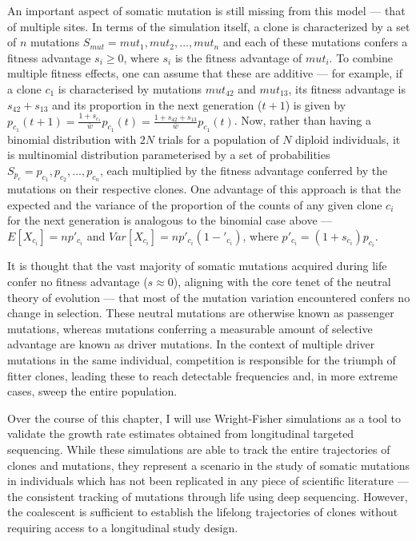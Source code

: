An important aspect of somatic mutation is still missing from this model --- that of multiple sites. In terms of the simulation itself, a clone is characterized by a set of $n$ mutations $S_{mut} = {mut_1,mut_2,...,mut_n}$ and each of these mutations confers a fitness advantage $s_i \geq 0$, where $s_i$ is the fitness advantage of $mut_i$. To combine multiple fitness effects, one can assume that these are additive --- for example, if a clone $c_1$ is characterised by mutations $mut_42$ and $mut_13$, its fitness advantage is $s_42 + s_13$ and its proportion in the next generation ($t+1$) is given by $p_{c_1}(t+1) = \frac{1+s_{c_1}}{\bar{w}}p_{c_1}(t) = \frac{1+s_{42}+s_{13}}{\bar{w}}p_{c_1}(t)$. Now, rather than having a binomial distribution with $2N$ trials for a population of $N$ diploid individuals, it is multinomial distribution parameterised by a set of probabilities $S_{p_c} = {p_{c_1},p_{c_2},...,p_{c_n}}$, each multiplied by the fitness advantage conferred by the mutations on their respective clones. One advantage of this approach is that the expected and the variance of the proportion of the counts of any given clone $c_i$ for the next generation is analogous to the binomial case above --- $E[X_{c_i}] = np'_{c_i}$ and $Var[X_{c_i}] = np'_{c_i}(1-'_{c_i})$, where $p'_{c_i} = (1+s_{c_i})p_{c_i}$. 

It is thought that the vast majority of somatic mutations acquired during life confer no fitness advantage ($s \approx 0$), aligning with the core tenet of the neutral theory of evolution --- that most of the mutation variation encountered confers no change in selection. These neutral mutations are otherwise known as passenger mutations, whereas mutations conferring a measurable amount of selective advantage are known as driver mutations. In the context of multiple driver mutations in the same individual, competition is responsible for the triumph of fitter clones, leading these to reach detectable frequencies and, in more extreme cases, sweep the entire population.

Over the course of this chapter, I will use Wright-Fisher simulations as a tool to validate the growth rate estimates obtained from longitudinal targeted sequencing. While these simulations are able to track the entire trajectories of clones and mutations, they represent a scenario in the study of somatic mutations in individuals which has not been replicated in any piece of scientific literature --- the consistent tracking of mutations through life using deep sequencing. However, the coalescent is sufficient to establish the lifelong trajectories of clones without requiring access to a longitudinal study design.

